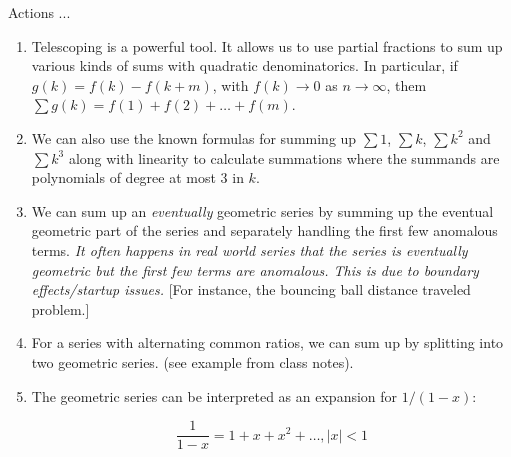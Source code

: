 \documentclass[10pt]{amsart}
\begin{document}
Actions ...

\begin{enumerate}
\item Telescoping is a powerful tool. It allows us to use partial
  fractions to sum up various kinds of sums with quadratic
  denominatorics. In particular, if $g(k) = f(k) - f(k + m)$, with
  $f(k) \to 0$ as $n \to \infty$, them $\sum g(k) = f(1) + f(2) +
  \dots + f(m)$.
\item We can also use the known formulas for summing up $\sum 1$,
  $\sum k$, $\sum k^2$ and $\sum k^3$ along with linearity to
  calculate summations where the summands are polynomials of degree at
  most $3$ in $k$.
\item We can sum up an {\em eventually} geometric series by summing up
  the eventual geometric part of the series and separately handling
  the first few anomalous terms. {\em It often happens in real world
  series that the series is eventually geometric but the first few
  terms are anomalous. This is due to boundary effects/startup
  issues.} [For instance, the bouncing ball distance traveled problem.]
\item For a series with alternating common ratios, we can sum up by
  splitting into two geometric series. (see example from class notes).
\item The geometric series can be interpreted as an expansion for $1/(1 - x)$:

  $$\frac{1}{1 - x} = 1 + x + x^2 + \dots, |x| < 1$$


\end{enumerate}
\end{document}
